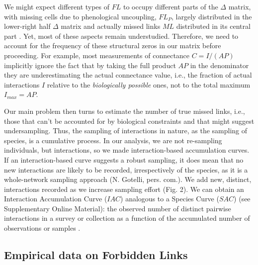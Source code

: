 \documentclass[12pt]{article}
\begin{document}
We might expect different types of $FL$ to occupy different parts of the $\Delta$ matrix, with missing cells due to phenological uncoupling, $FL_P$, largely distributed in the lower-right half $\Delta$ matrix and actually missed links $ML$ distributed in its central part \citep{Olesen:2010fi}. Yet, most of these aspects remain understudied. Therefore, we need to account for the frequency of these structural zeros in our matrix before proceeding. For example, most measurements of connectance $C= I/(AP)$ implicitly ignore the fact that by taking the full product $AP$ in the denominator they are underestimating the actual connectance value, i.e., the fraction of actual interactions $I$ relative to the \emph{biologically possible} ones, not to the total maximum $I_{max}= AP$. 

Our main problem then turns to estimate the number of true missed links, i.e., those that can't be accounted for by biological constraints and that might suggest undersampling. Thus, the sampling of interactions in nature, as the sampling of species, is a cumulative process. In our analysis, we are not re-sampling individuals, but interactions, so we made interaction-based accumulation curves. If an interaction-based curve suggests  a robust sampling, it does mean that no new interactions are likely to be recorded, irrespectively of the species, as it is a whole-network sampling approach (N. Gotelli, pers. com.). We add new, distinct, interactions recorded as we increase sampling effort (Fig. 2). We can obtain an Interaction Accumulation Curve ($IAC$) analogous to a Species Curve ($SAC$) (see Supplementary Online Material): the observed number of distinct pairwise interactions in a survey or collection as a function of the accumulated number of observations or samples \citep{Colwell:2009gv}. 

\subsection{Empirical data on Forbidden Links}
\end{document}
